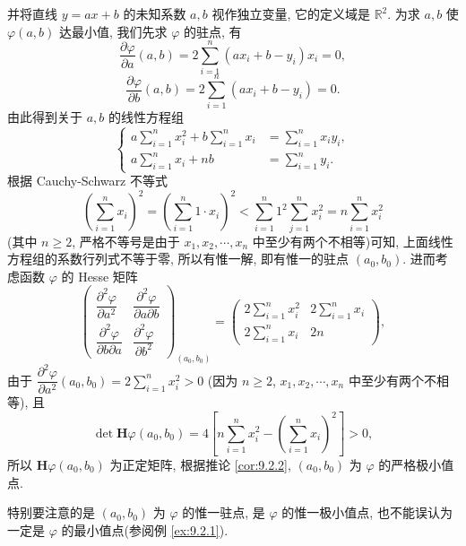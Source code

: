 \begin{solution}
并将直线 $y = ax + b$ 的未知系数 $a, b$ 视作独立变量, 它的定义域是 $\mathbb{R}^{2}$. 为求 $a, b$ 使 $\varphi(a, b)$ 达最小值, 我们先求 $\varphi$ 的驻点, 有
\[
  \frac{\partial\varphi}{\partial a}(a, b) = 2\sum_{i=1}^{n}(ax_{i} + b - y_{i})x_{i} = 0,
\]
\[
  \frac{\partial\varphi}{\partial b}(a, b) = 2\sum_{i=1}^{n}(ax_{i} + b - y_{i}) = 0.
\]
由此得到关于 $a, b$ 的线性方程组
\[
  \left\{\begin{aligned}
    a\sum_{i=1}^{n}x_{i}^{2} + b\sum_{i=1}^{n}x_{i} &= \sum_{i=1}^{n}x_{i}y_{i}, \\
    a\sum_{i=1}^{n}x_{i} + nb &= \sum_{i=1}^{n}y_{i}.
  \end{aligned}\right.
\]
根据 Cauchy-Schwarz 不等式
\[
  \left(\sum_{i=1}^{n}x_{i}\right)^{2} = \left(\sum_{i=1}^{n}1 \cdot x_{i}\right)^{2} < \sum_{i=1}^{n}1^{2}\sum_{j=1}^{n}x_{i}^{2} = n\sum_{i=1}^{n}x_{i}^{2}
\]
(其中 $n \geqslant 2$, 严格不等号是由于 $x_{1}, x_{2}, \cdots, x_{n}$ 中至少有两个不相等)可知, 上面线性方程组的系数行列式不等于零, 所以有惟一解, 即有惟一的驻点 $(a_{0}, b_{0})$. 进而考虑函数 $\varphi$ 的 Hesse 矩阵
\[
  \begin{pmatrix}
    \dfrac{\partial^{2}\varphi}{\partial a^{2}} & \dfrac{\partial^{2}\varphi}{\partial a\partial b} \\
    \dfrac{\partial^{2}\varphi}{\partial b\partial a} & \dfrac{\partial^{2}\varphi}{\partial b^{2}}
  \end{pmatrix}_{(a_{0}, b_{0})} = \begin{pmatrix}
    2\sum\limits_{i=1}^{n}x_{i}^{2} & 2\sum\limits_{i=1}^{n}x_{i} \\
    2\sum\limits_{i=1}^{n}x_{i} & 2n
  \end{pmatrix},
\]
由于 $\dfrac{\partial^{2}\varphi}{\partial a^{2}}(a_{0}, b_{0}) = 2\sum\limits_{i=1}^{n}x_{i}^{2} > 0$ (因为 $n \geqslant 2$, $x_{1}, x_{2}, \cdots, x_{n}$ 中至少有两个不相等), 且
\[
  \det\boldsymbol{H}\varphi(a_{0}, b_{0}) = 4\left[n\sum_{i=1}^{n}x_{i}^{2} - \left(\sum_{i=1}^{n}x_{i}\right)^{2}\right] > 0,
\]
所以 $\boldsymbol{H}\varphi(a_{0}, b_{0})$ 为正定矩阵, 根据推论 \ref{cor:9.2.2}, $(a_{0}, b_{0})$ 为 $\varphi$ 的严格极小值点.

特别要注意的是 $(a_{0}, b_{0})$ 为 $\varphi$ 的惟一驻点, 是 $\varphi$ 的惟一极小值点, 也不能误认为一定是 $\varphi$ 的最小值点(参阅例 \ref{ex:9.2.1}).


\end{solution}
